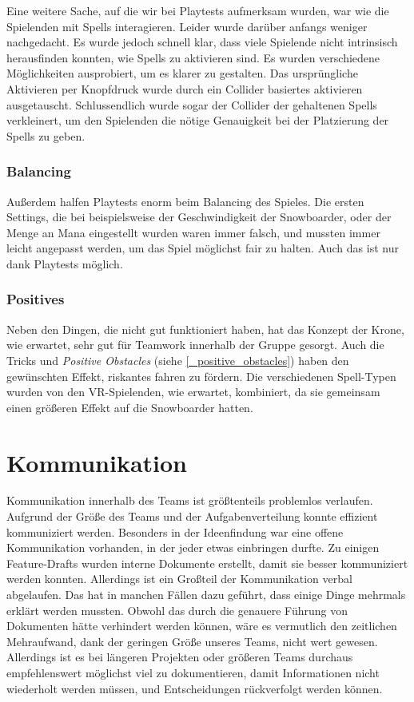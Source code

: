 Eine weitere Sache, auf die wir bei Playtests aufmerksam wurden, war wie die Spielenden mit Spells interagieren. Leider wurde darüber anfangs weniger nachgedacht. Es wurde jedoch schnell klar, dass viele Spielende nicht intrinsisch herausfinden konnten, wie Spells zu aktivieren sind. Es wurden verschiedene Möglichkeiten ausprobiert, um es klarer zu gestalten. Das ursprüngliche Aktivieren per Knopfdruck wurde durch ein Collider basiertes aktivieren ausgetauscht. Schlussendlich wurde sogar der Collider der gehaltenen Spells verkleinert, um den Spielenden die nötige Genauigkeit bei der Platzierung der Spells zu geben.

\subsubsection{Balancing}

Außerdem halfen Playtests enorm beim Balancing des Spieles. Die ersten Settings, die bei beispielsweise der Geschwindigkeit der Snowboarder, oder der Menge an Mana eingestellt wurden waren immer falsch, und mussten immer leicht angepasst werden, um das Spiel möglichst fair zu halten. Auch das ist nur dank Playtests möglich.

\subsubsection{Positives}

Neben den Dingen, die nicht gut funktioniert haben, hat das Konzept der Krone, wie erwartet, sehr gut für Teamwork innerhalb der Gruppe gesorgt. Auch die Tricks und \emph{Positive Obstacles} (siehe \ref{_positive_obstacles}) haben den gewünschten Effekt, riskantes fahren zu fördern. Die verschiedenen Spell-Typen wurden von den VR-Spielenden, wie erwartet, kombiniert, da sie gemeinsam einen größeren Effekt auf die Snowboarder hatten.

\section{Kommunikation}
Kommunikation innerhalb des Teams ist größtenteils problemlos verlaufen. Aufgrund der Größe des Teams und der Aufgabenverteilung konnte effizient kommuniziert werden. Besonders in der Ideenfindung war eine offene Kommunikation vorhanden, in der jeder etwas einbringen durfte. Zu einigen Feature-Drafts wurden interne Dokumente erstellt, damit sie besser kommuniziert werden konnten. Allerdings ist ein Großteil der Kommunikation verbal abgelaufen. Das hat in manchen Fällen dazu geführt, dass einige Dinge mehrmals erklärt werden mussten. Obwohl das durch die genauere Führung von Dokumenten hätte verhindert werden können, wäre es vermutlich den zeitlichen Mehraufwand, dank der geringen Größe unseres Teams, nicht wert gewesen. Allerdings ist es bei längeren Projekten oder größeren Teams durchaus empfehlenswert möglichst viel zu dokumentieren, damit Informationen nicht wiederholt werden müssen, und Entscheidungen rückverfolgt werden können.

